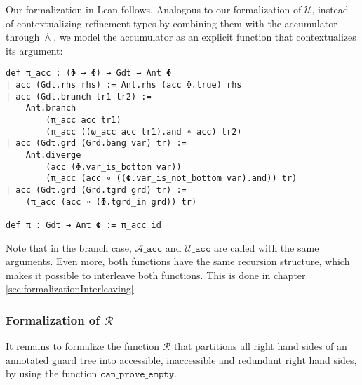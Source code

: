 Our formalization in Lean follows. Analogous to our formalization of $\mathcal{U}$, instead of contextualizing refinement types by
combining them with the accumulator through $\,\dot{\wedge}\,$, we model the accumulator as an explicit function
that contextualizes its argument:

\begin{verbatim}
def π_acc : (Φ → Φ) → Gdt → Ant Φ
| acc (Gdt.rhs rhs) := Ant.rhs (acc Φ.true) rhs
| acc (Gdt.branch tr1 tr2) :=
    Ant.branch
        (π_acc acc tr1)
        (π_acc ((ω_acc acc tr1).and ∘ acc) tr2)
| acc (Gdt.grd (Grd.bang var) tr) :=
    Ant.diverge
        (acc (Φ.var_is_bottom var)) 
        (π_acc (acc ∘ ((Φ.var_is_not_bottom var).and)) tr)
| acc (Gdt.grd (Grd.tgrd grd) tr) :=
    (π_acc (acc ∘ (Φ.tgrd_in grd)) tr)

def π : Gdt → Ant Φ := π_acc id
\end{verbatim}

Note that in the branch case, $\mathcal{A}\mathtt{\_acc}$ and $\mathcal{U}\mathtt{\_acc}$
are called with the same arguments. Even more, both functions have the same recursion structure, which
makes it possible to interleave both functions.
This is done in chapter \ref{sec:formalizationInterleaving}.



\subsubsection{Formalization of $\mathcal{R}$}

It remains to formalize the function $\mathcal{R}$ that partitions
all right hand sides of an annotated guard tree into accessible, inaccessible and redundant right hand sides,
by using the function $\mathtt{can\_prove\_empty}$.

